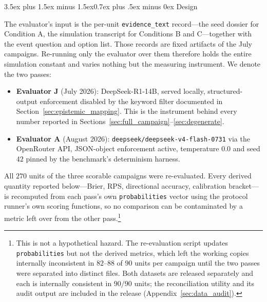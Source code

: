 \documentclass[11pt,journal,onecolumn]{IEEEtran}
\makeatletter
\renewcommand\subsection{\@startsection{subsection}{2}{\z@}%
  {3.5ex plus 1.5ex minus 1.5ex}{0.7ex plus .5ex minus 0ex}%
  {\normalfont\normalsize\bfseries}}
\makeatother
\begin{document}
\subsection{Design}
\label{sec:replication_design}

The evaluator's input is the per-unit \texttt{evidence\_text} record---the seed dossier for Condition A, the simulation transcript for Conditions B and C---together with the event question and option list. Those records are fixed artifacts of the July campaigns. Re-running only the evaluator over them therefore holds the entire simulation constant and varies nothing but the measuring instrument. We denote the two passes:

\begin{itemize}
    \item \textbf{Evaluator J} (July 2026): DeepSeek-R1-14B, served locally, structured-output enforcement disabled by the keyword filter documented in Section~\ref{sec:epistemic_mapping}. This is the instrument behind every number reported in Sections~\ref{sec:full_campaign}--\ref{sec:degenerate}.
    \item \textbf{Evaluator A} (August 2026): \texttt{deepseek/deepseek-v4-flash-0731} via the OpenRouter API, JSON-object enforcement active, temperature $0.0$ and seed $42$ pinned by the benchmark's determinism harness.
\end{itemize}

All $270$ units of the three scorable campaigns were re-evaluated. Every derived quantity reported below---Brier, RPS, directional accuracy, calibration bracket---is recomputed from each pass's own \texttt{probabilities} vector using the protocol runner's own scoring functions, so no comparison can be contaminated by a metric left over from the other pass.\footnote{This is not a hypothetical hazard. The re-evaluation script updates \texttt{probabilities} but not the derived metrics, which left the working copies internally inconsistent in $82$--$88$ of $90$ units per campaign until the two passes were separated into distinct files. Both datasets are released separately and each is internally consistent in $90/90$ units; the reconciliation utility and its audit output are included in the release (Appendix~\ref{sec:data_audit}).}
\end{document}
